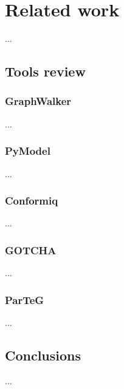 \chapter{Related work}
\label{cha:relatedwork}

...

\section{Tools review}
\label{sec:toolsreview}


\subsection{GraphWalker}
\label{sub:graphwalker}

...


\subsection{PyModel}
\label{sub:pymodel}

...


\subsection{Conformiq}
\label{sub:conformiq}

...


\subsection{GOTCHA}
\label{sub:gotcha}

...


\subsection{ParTeG}
\label{sub:parteg}

...



\section{Conclusions}
\label{sec:conclusions}

...


